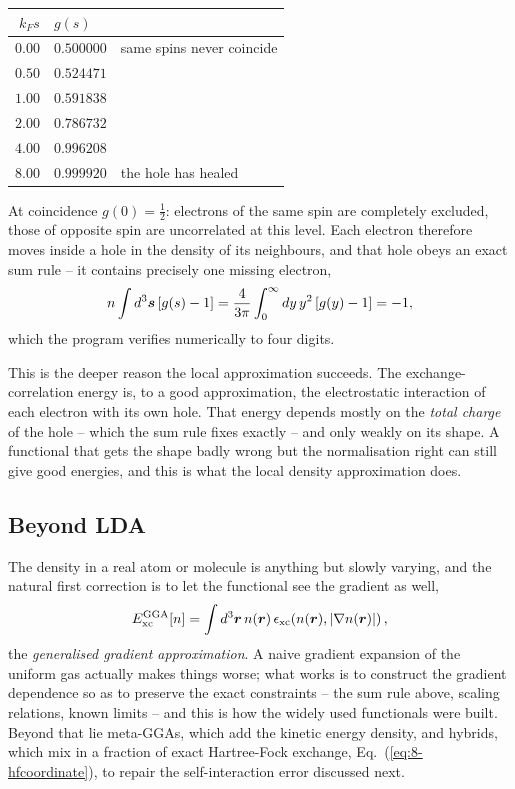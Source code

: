 \begin{center}
\renewcommand{\arraystretch}{1.2}
\setlength{\tabcolsep}{11pt}
\begin{tabular}{rll}
\toprule
$k_F s$ & $g(s)$ & \\
\midrule
$0.00$  & $0.500000$ & same spins never coincide\\
$0.50$  & $0.524471$ & \\
$1.00$  & $0.591838$ & \\
$2.00$  & $0.786732$ & \\
$4.00$  & $0.996208$ & \\
$8.00$  & $0.999920$ & the hole has healed\\
\bottomrule
\end{tabular}
\end{center}

At coincidence $g(0)=\tfrac12$: electrons of the same spin are completely
excluded, those of opposite spin are uncorrelated at this level.  Each
electron therefore moves inside a hole in the density of its neighbours, and
that hole obeys an exact sum rule -- it contains precisely one missing
electron,
\begin{equation}
  n\int d^3\bm{s}\left[g(s)-1\right]
   = \frac{4}{3\pi}\int_0^{\infty}dy\,y^2\left[g(y)-1\right]
   = -1 ,
  \label{eq:8-sumrule}
\end{equation}
which the program verifies numerically to four digits.

This is the deeper reason the local approximation succeeds.  The
exchange-correlation energy is, to a good approximation, the electrostatic
interaction of each electron with its own hole.  That energy depends mostly
on the \emph{total charge} of the hole -- which the sum rule fixes exactly --
and only weakly on its shape.  A functional that gets the shape badly wrong
but the normalisation right can still give good energies, and this is what
the local density approximation does.

\subsection{Beyond LDA}
\label{sec:beyondlda}

The density in a real atom or molecule is anything but slowly varying, and
the natural first correction is to let the functional see the gradient as
well,
\begin{equation}
  E_{\mathrm{xc}}^{\mathrm{GGA}}[n]
   = \int d^3\bm{r}\,n(\bm{r})\,
     \epsilon_{\mathrm{xc}}\!\left(n(\bm{r}),
       \vert\nabla n(\bm{r})\vert\right),
  \label{eq:8-gga}
\end{equation}
the \emph{generalised gradient approximation}.  A naive gradient expansion of
the uniform gas actually makes things worse; what works is to construct the
gradient dependence so as to preserve the exact constraints -- the sum rule
above, scaling relations, known limits -- and this is how the widely used
functionals were built.  Beyond that lie meta-GGAs, which add the kinetic
energy density, and hybrids, which mix in a fraction of exact Hartree-Fock
exchange, Eq.~(\ref{eq:8-hfcoordinate}), to repair the self-interaction error
discussed next.

